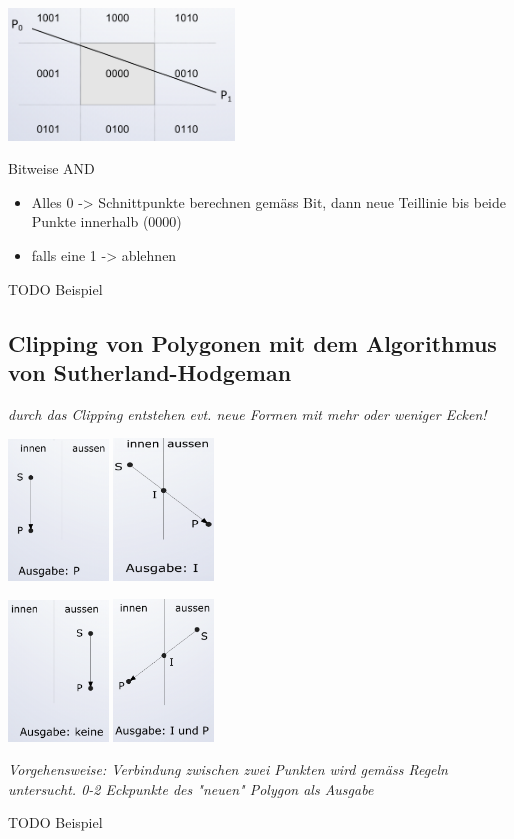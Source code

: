 \includegraphics[width=0.45\textwidth]{assets/clipping_Cohen-Sutherland.png}

Bitweise AND
\begin{itemize}
	\item Alles 0 -> Schnittpunkte berechnen gemäss Bit, dann neue Teillinie bis beide Punkte innerhalb (0000)
	\item falls eine 1 -> ablehnen
\end{itemize}

TODO Beispiel

\subsection{Clipping von Polygonen mit dem Algorithmus von Sutherland-Hodgeman}
\textit{durch das Clipping entstehen evt. neue Formen mit mehr oder weniger Ecken!}

\includegraphics[width=0.2\textwidth]{assets/Sutherland-Hodgeman1.png}
\includegraphics[width=0.2\textwidth]{assets/Sutherland-Hodgeman2.png}

\includegraphics[width=0.2\textwidth]{assets/Sutherland-Hodgeman3.png}
\includegraphics[width=0.2\textwidth]{assets/Sutherland-Hodgeman4.png}

\textit{Vorgehensweise: Verbindung zwischen zwei Punkten wird gemäss Regeln untersucht. 0-2 Eckpunkte des "neuen" Polygon als Ausgabe}

TODO Beispiel